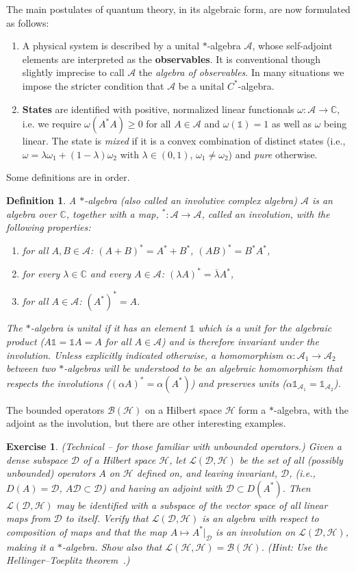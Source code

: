 \documentclass[12pt,a4paper]{article}
\newcommand{\1}{\mathds{1}}                         %
\newcommand{\CC}{\mathbb{C}}           %
\newcommand{\Hcal}{\mathcal {H}}
\newcommand{\Lcal}{\mathcal {L}}
\newcommand{\Bcal}{\mathcal {B}}
\newcommand{\C}{\mathbb{C}}
\newcommand{\BB}{{\mathcal{B}}}
\newcommand{\HH}{{\mathcal{H}}}
\newcommand{\DD}{{\mathscr{D}}}
\newcommand{\II}{{\mathbb{1}}}
\newcommand{\Ac}{{\mathcal{A}}}
\newtheorem{exercise}[theorem]{Exercise}
\newtheorem{df}[theorem]{Definition}}
\begin{document}
The main postulates of quantum theory, in its algebraic form, are now formulated as follows: 
\begin{enumerate}
	\item A physical system is described by a unital $*$-algebra $\Ac$, 
	whose self-adjoint elements are interpreted as the \textbf{observables}. It is conventional though slightly imprecise to call $\Ac$ the \textit{algebra of observables}.
	In many situations we impose the stricter condition that $\Ac$ be a unital $C^*$-algebra.
	\item \textbf{States} are identified with positive, normalized linear functionals  $\omega:\Ac\to\CC$, i.e. we require $\omega(A^*A)\geq 0$ for all $A\in\Ac$ and $\omega(\1)=1$ as well as $\omega$ being linear. The state is
	\emph{mixed} if it is a convex combination of distinct states (i.e., $\omega=\lambda\omega_1+(1-\lambda)\omega_2$ with $\lambda\in(0,1)$, $\omega_1\neq \omega_2$) and \emph{pure} otherwise. 
\end{enumerate}
Some definitions are in order. 
\begin{df}
	A \emph{$*$-algebra} (also called an involutive complex algebra) $\Ac$ is an algebra over $\C$, together with a map, ${}^*:\Ac \rightarrow \Ac$, called an involution, with the following properties:
	\begin{enumerate}
		\item    for all $A, B \in \Ac$: $(A + B)^* = A^* + B^*$, $(A B)^* = B^* A^*$,
		\item   for every $\lambda\in\CC$ and every $A \in \Ac$: $(\lambda A)^* = \overline{\lambda} A^*$,
		\item    for all $A \in \Ac$: $(A^*)^* = A$.
	\end{enumerate}
	The $*$-algebra is \emph{unital} if it has an element $\II$ which is a unit for the algebraic product ($A\II=\II A=A$ for all $A\in\Ac$) and is therefore invariant under the involution. Unless explicitly indicated otherwise, a homomorphism $\alpha:\Ac_1\to\Ac_2$ between two $*$-algebras will be understood to be an algebraic homomorphism that respects the involutions ($(\alpha A)^*=\alpha (A^*)$) and preserves units ($\alpha \II_{\Ac_1}=\II_{\Ac_2}$).  
\end{df}
 The bounded operators $\Bcal(\Hcal)$ on a Hilbert space $\Hcal$ form a $*$-algebra, with the adjoint as the involution, but there are other interesting examples. 
\begin{exercise}\label{ex:LDH}
(Technical -- for those familiar with unbounded operators.) Given a dense subspace $\DD$ of a Hilbert space $\HH$, let $\Lcal(\DD,\HH)$
be the set of all (possibly unbounded) operators $A$ on $\HH$ defined on, and leaving invariant, $\DD$, (i.e., $D(A)=\DD$, $A\DD\subset\DD$) and having an adjoint with $\DD\subset D(A^*)$. Then $\Lcal(\DD,\HH)$ may be identified with a subspace of the vector space of all linear maps from $\DD$ to itself. Verify that $\Lcal(\DD,\HH)$ is an algebra with respect to composition of maps and that the map $A\mapsto A^*|_\DD$ is an involution on $\Lcal(\DD,\HH)$, making it a $*$-algebra. Show also that $\Lcal(\HH,\HH)=\BB(\HH)$. (Hint: Use the Hellinger--Toeplitz theorem~\cite[\S III.5]{ReedSimon:vol1}.)
\end{exercise}  
\end{document}
